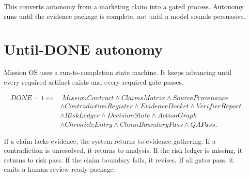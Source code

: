 \documentclass[11pt]{article}
\begin{document}
This converts autonomy from a marketing claim into a gated process. Autonomy runs until the evidence package is complete, not until a model sounds persuasive.

\section{Until-DONE autonomy}
Mission OS uses a run-to-completion state machine. It keeps advancing until every required artifact exists and every required gate passes.

\begin{center}
\end{center}

\begin{align}
DONE=1\Longleftrightarrow&\; MissionContract \land ClaimsMatrix \land SourceProvenance \\
&\land ContradictionRegister \land EvidenceDocket \land VerifierReport \\
&\land RiskLedger \land DecisionState \land ActionGraph \\
&\land ChronicleEntry \land ClaimBoundaryPass \land QAPass.
\end{align}

If a claim lacks evidence, the system returns to evidence gathering. If a contradiction is unresolved, it returns to analysis. If the risk ledger is missing, it returns to risk pass. If the claim boundary fails, it revises. If all gates pass, it emits a human-review-ready package.
\end{document}
